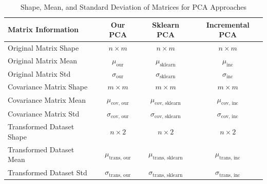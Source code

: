 \begin{table}[h!]
    \centering
    \caption{Shape, Mean, and Standard Deviation of Matrices for PCA Approaches}
    \label{tab:matrix_stats}
    \begin{tabular}{|l|c|c|c|}
        \hline
        \textbf{Matrix Information} & \textbf{Our PCA} & \textbf{Sklearn PCA} & \textbf{Incremental PCA} \\ \hline
        Original Matrix Shape       & $n \times m$      & $n \times m$         & $n \times m$             \\ \hline
        Original Matrix Mean        & $\mu_{\text{our}}$ & $\mu_{\text{sklearn}}$ & $\mu_{\text{inc}}$       \\ \hline
        Original Matrix Std         & $\sigma_{\text{our}}$ & $\sigma_{\text{sklearn}}$ & $\sigma_{\text{inc}}$ \\ \hline
        Covariance Matrix Shape     & $m \times m$      & $m \times m$         & $m \times m$             \\ \hline
        Covariance Matrix Mean      & $\mu_{\text{cov, our}}$ & $\mu_{\text{cov, sklearn}}$ & $\mu_{\text{cov, inc}}$ \\ \hline
        Covariance Matrix Std       & $\sigma_{\text{cov, our}}$ & $\sigma_{\text{cov, sklearn}}$ & $\sigma_{\text{cov, inc}}$ \\ \hline
        Transformed Dataset Shape   & $n \times 2$      & $n \times 2$         & $n \times 2$             \\ \hline
        Transformed Dataset Mean    & $\mu_{\text{trans, our}}$ & $\mu_{\text{trans, sklearn}}$ & $\mu_{\text{trans, inc}}$ \\ \hline
        Transformed Dataset Std     & $\sigma_{\text{trans, our}}$ & $\sigma_{\text{trans, sklearn}}$ & $\sigma_{\text{trans, inc}}$ \\ \hline
    \end{tabular}
\end{table}

